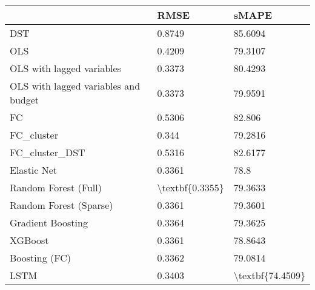\begin{tabular}{lll}
\toprule
{} &             RMSE &             sMAPE \\
\midrule
DST                                  &           0.8749 &           85.6094 \\
OLS                                  &           0.4209 &           79.3107 \\
OLS with lagged variables            &           0.3373 &           80.4293 \\
OLS with lagged variables and budget &           0.3373 &           79.9591 \\
FC                                   &           0.5306 &            82.806 \\
FC\_cluster                           &            0.344 &           79.2816 \\
FC\_cluster\_DST                       &           0.5316 &           82.6177 \\
Elastic Net                          &           0.3361 &              78.8 \\
Random Forest (Full)                 &  \textbackslash textbf\{0.3355\} &           79.3633 \\
Random Forest (Sparse)               &           0.3361 &           79.3601 \\
Gradient Boosting                    &           0.3364 &           79.3625 \\
XGBoost                              &           0.3361 &           78.8643 \\
Boosting (FC)                        &           0.3362 &           79.0814 \\
LSTM                                 &           0.3403 &  \textbackslash textbf\{74.4509\} \\
\bottomrule
\end{tabular}

